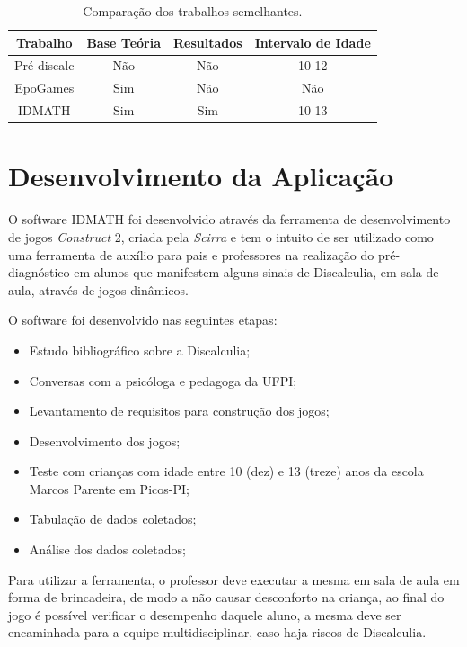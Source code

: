 \documentclass[
	12pt,				%
    oneside,			%
	a4paper,			%
	english,			%
	french,				%
	spanish,			%
	brazil,				%
	]{abntex2}
\begin{document}
\begin{table}[h]
\centering
\caption{Comparação dos trabalhos semelhantes.}
\label{semelhantes}
\begin{tabular}{|c|c|c|c|}
\hline
Trabalho    & Base Teória & Resultados & Intervalo de Idade \\ \hline
Pré-discalc &   Não     &     Não      &          10-12          \\ \hline
EpoGames    &    Sim         &      Não      &         Não           \\ \hline
IDMATH      &       Sim      &    Sim        &          10-13          \\ \hline
\end{tabular}
\end{table}






\chapter{Desenvolvimento da Aplicação}

O software IDMATH foi desenvolvido através da ferramenta de desenvolvimento de jogos \textit{Construct} 2, criada pela \textit{Scirra} e tem o  intuito de ser utilizado como uma ferramenta de auxílio para pais e professores na realização do pré-diagnóstico em alunos que manifestem alguns sinais de Discalculia, em sala de aula, através de jogos dinâmicos.

O software foi desenvolvido nas seguintes etapas:

\begin{itemize}
\item Estudo bibliográfico sobre a Discalculia;
\item Conversas com a psicóloga e pedagoga da UFPI;
\item Levantamento de requisitos para construção dos jogos;
\item Desenvolvimento dos jogos;
\item Teste com crianças com idade entre 10 (dez) e 13 (treze) anos da escola Marcos Parente em Picos-PI;
\item Tabulação de dados coletados;
\item Análise dos dados coletados;
\end{itemize}

Para utilizar a ferramenta, o professor deve executar a mesma em sala de aula em forma de brincadeira, de modo a não causar desconforto na criança, ao final do jogo é possível verificar o desempenho daquele aluno, a mesma deve ser encaminhada para a equipe multidisciplinar, caso haja riscos de Discalculia.
\end{document}

